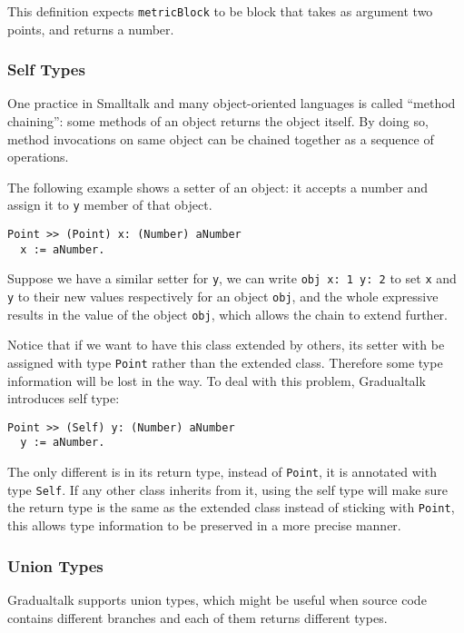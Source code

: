 This definition expects \texttt{metricBlock} to be block
that takes as argument two points, and returns a number.

\subsubsection{Self Types}

One practice in Smalltalk and many object-oriented languages
is called ``method chaining'': 
some methods of an object returns the object itself.
By doing so, method invocations on same object can be
chained together as a sequence of operations.

The following example shows a setter of an object:
it accepts a number and assign it to \texttt{y} member of that object.

\begin{verbatim}
Point >> (Point) x: (Number) aNumber
  x := aNumber.
\end{verbatim}

Suppose we have a similar setter for \texttt{y},
we can write \texttt{obj x: 1 y: 2} to set \texttt{x}
and \texttt{y} to their new values respectively for an object \texttt{obj},
and the whole expressive results in the value of the object \texttt{obj},
which allows the chain to extend further.

Notice that if we want to have this class extended by others,
its setter with be assigned with type \texttt{Point} rather
than the extended class.
Therefore some type information will be lost in the way.
To deal with this problem, Gradualtalk introduces self type:

\begin{verbatim}
Point >> (Self) y: (Number) aNumber
  y := aNumber.
\end{verbatim}

The only different is in its return type, instead of \texttt{Point},
it is annotated with type \texttt{Self}.
If any other class inherits from it, using the self type will make sure
the return type is the same as the extended class
instead of sticking with \texttt{Point},
this allows type information to be preserved in a more precise manner.

\subsubsection{Union Types}

Gradualtalk supports union types, which might be useful when
source code contains different branches and
each of them returns different types.

